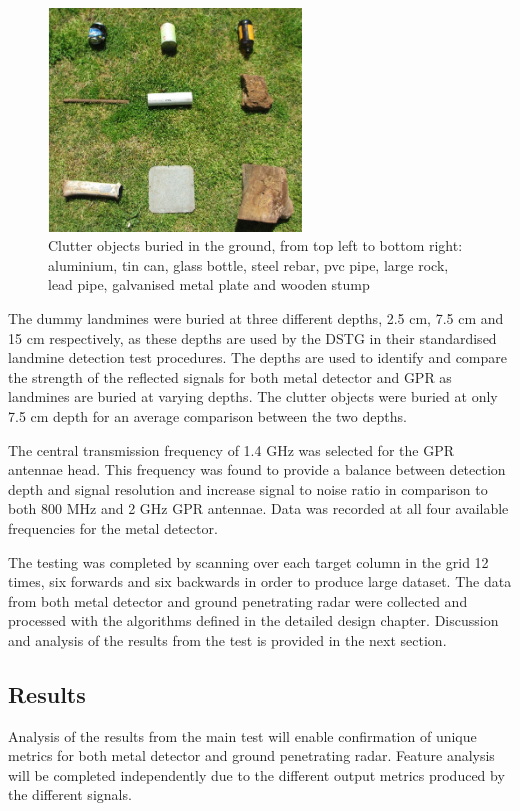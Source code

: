 \documentclass[main.tex]{subfiles}
\begin{document}
\begin{figure}[ht]
\includegraphics[width=0.6\textwidth]{5-Testing/clutter.PNG}
\centering
\caption[Clutter objects buried in the ground]{Clutter objects buried in the ground, from top left to bottom right: aluminium, tin can, glass bottle, steel rebar, pvc pipe, large rock, lead pipe, galvanised metal plate and wooden stump}
\end{figure}

The dummy landmines were buried at three different depths, 2.5 cm, 7.5 cm and 15 cm respectively, as these depths are used by the DSTG in their standardised landmine detection test procedures. The depths are used to identify and compare the strength of the reflected signals for both metal detector and GPR as landmines are buried at varying depths. The clutter objects were buried at only 7.5 cm depth for an average comparison between the two depths. 

The central transmission frequency of 1.4 GHz was selected for the GPR antennae head. This frequency was found to provide a balance between detection depth and signal resolution and increase signal to noise ratio in comparison to both 800 MHz and 2 GHz GPR antennae. Data was recorded at all four available frequencies for the metal detector.

The testing was completed by scanning over each target column in the grid 12 times, six forwards and six backwards in order to produce large dataset. The data from both metal detector and ground penetrating radar were collected and processed with the algorithms defined in the detailed design chapter. Discussion and analysis of the results from the test is provided in the next section. 

\subsection{Results}
Analysis of the results from the main test will enable confirmation of unique metrics for both metal detector and ground penetrating radar. Feature analysis will be completed independently due to the different output metrics produced by the different signals. 
\end{document}
